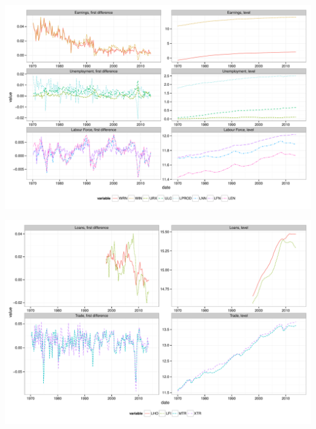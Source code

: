 \documentclass[11pt,oneside, a4paper]{amsart}\usepackage[]{graphicx}\usepackage[]{color}
\newenvironment{knitrout}{}{} %
\begin{document}
\begin{knitrout}
\color{fgcolor}

{\centering \includegraphics[width=\textwidth]{figure/plot_cou_uem-1} 

}



\end{knitrout}



\begin{knitrout}
\color{fgcolor}

{\centering \includegraphics[width=\textwidth]{figure/plot_rest-1} 

}



\end{knitrout}
\end{document}
